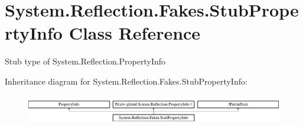 \hypertarget{class_system_1_1_reflection_1_1_fakes_1_1_stub_property_info}{\section{System.\-Reflection.\-Fakes.\-Stub\-Property\-Info Class Reference}
\label{class_system_1_1_reflection_1_1_fakes_1_1_stub_property_info}
}


Stub type of System.\-Reflection.\-Property\-Info 


Inheritance diagram for System.\-Reflection.\-Fakes.\-Stub\-Property\-Info\-:\begin{figure}[H]
\begin{center}
\leavevmode
\includegraphics[height=1.314554cm]{class_system_1_1_reflection_1_1_fakes_1_1_stub_property_info}
\end{center}
\end{figure}
